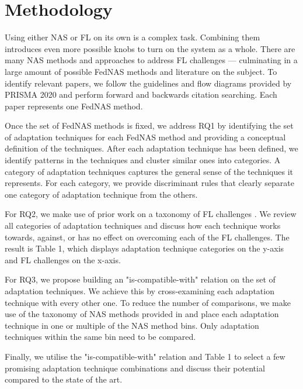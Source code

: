 \section{Methodology}

Using either NAS or FL on its own is a complex task. Combining them introduces even more possible knobs to turn on the system as a whole. There are many NAS methods and approaches to address FL challenges — culminating in a large amount of possible FedNAS methods and literature on the subject. To identify relevant papers, we follow the guidelines and flow diagrams provided by PRISMA 2020 \cite{prisma_2020} and perform forward and backwards citation searching. Each paper represents one FedNAS method.

Once the set of FedNAS methods is fixed, we address RQ1 by identifying the set of adaptation techniques for each FedNAS method and providing a conceptual definition of the techniques. After each adaptation technique has been defined, we identify patterns in the techniques and cluster similar ones into categories. A category of adaptation techniques captures the general sense of the techniques it represents. For each category, we provide discriminant rules that clearly separate one category of adaptation technique from the others.

For RQ2, we make use of prior work on a taxonomy of FL challenges \cite{fl_taxonomy_2024}. We review all categories of adaptation techniques and discuss how each technique works towards, against, or has no effect on overcoming each of the FL challenges. The result is Table 1, which displays adaptation technique categories on the y-axis and FL challenges on the x-axis.

For RQ3, we propose building an "is-compatible-with" relation on the set of adaptation techniques. We achieve this by cross-examining each adaptation technique with every other one. To reduce the number of comparisons, we make use of the taxonomy of NAS methods provided in \cite{nas_1000_papers_2023} and place each adaptation technique in one or multiple of the NAS method bins. Only adaptation techniques within the same bin need to be compared.

Finally, we utilise the "is-compatible-with" relation and Table 1 to select a few promising adaptation technique combinations and discuss their potential compared to the state of the art.

